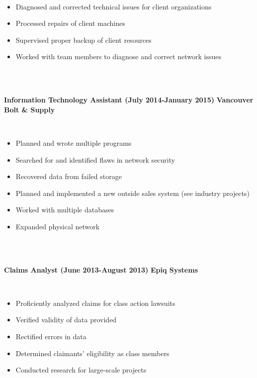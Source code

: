 \documentclass{article}
\begin{document}
\phantom \\
\begin{itemize}
\item Diagnosed and corrected technical issues for client organizations
\item Processed repairs of client machines
\item Supervised proper backup of client resources
\item Worked with team members to diagnose and correct network issues
\end{itemize}
\phantom \\
\phantom \\
%
%
%
%
\begin{vwcol}[widths={0.8,0.2}, sep=.8cm, justify=flush, rule=0pt, indent=0em]
\noindent \textbf{Information Technology Assistant (July 2014-January 2015)}
\newpage
\noindent \textbf{Vancouver Bolt \& Supply}
\end{vwcol}
\phantom \\
\begin{itemize}
\item Planned and wrote multiple programs
\item Searched for and identified flaws in network security
\item Recovered data from failed storage
\item Planned and implemented a new outside sales system (see industry projects)
\item Worked with multiple databases
\item Expanded physical network
\end{itemize}
\phantom \\
\phantom \\
%
%
%
%
\begin{vwcol}[widths={0.8,0.2}, sep=.8cm, justify=flush, rule=0pt, indent=0em]
\noindent \textbf{Claims Analyst (June 2013-August 2013)}
\newpage
\noindent \textbf{Epiq Systems}
\end{vwcol}
\phantom \\
\begin{itemize}
\item Proficiently analyzed claims for class action lawsuits
\item Verified validity of data provided
\item Rectified errors in data
\item Determined claimants' eligibility as class members
\item Conducted research for large-scale projects
\end{itemize}
\end{document}
